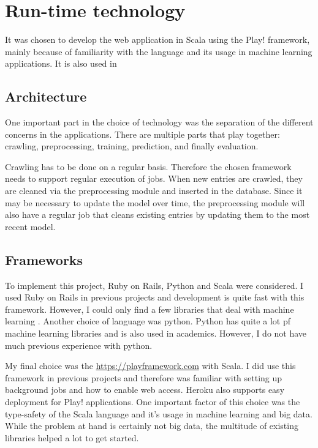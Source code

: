 \documentclass[journal,10pt]{IEEEtran}
\begin{document}
\section{Run-time technology}

It was chosen to develop the web application in Scala using the Play! framework, mainly because of familiarity with the language and its usage in machine learning applications. It is also used in  

\subsection{Architecture}\label{sec:architecture}
One important part in the choice of technology was the separation of the different concerns in the applications. There are multiple parts that play together: crawling, preprocessing, training, prediction, and finally evaluation. 

Crawling has to be done on a regular basis. Therefore the chosen framework needs to support regular execution of jobs. When new entries are crawled, they are cleaned via the preprocessing module and inserted in the database. Since it may be necessary to update the model over time, the preprocessing module will also have a regular job that cleans existing entries by updating them to the most recent model.


\subsection{Frameworks}\label{sec:frameworks}
To implement this project, Ruby on Rails, Python and Scala were considered. I used Ruby on Rails in previous projects and development is quite fast with this framework. However, I could only find a few libraries that deal with machine learning \cite{bigml} \cite{leanpanda}. 
Another choice of language was python. Python has quite a lot pf machine learning libraries and is also used in academics. However, I do not have much previous experience with python.

My final choice was the \href{Play! framework}{https://playframework.com} with Scala. I did use this framework in previous projects and therefore was familiar with setting up background jobs and how to enable web access. Heroku also supports easy deployment for Play! applications. One important factor of this choice was the type-safety of the Scala language and it's usage in machine learning and big data. While the problem at hand is certainly not big data, the multitude of existing libraries helped a lot to get started.
\end{document}
